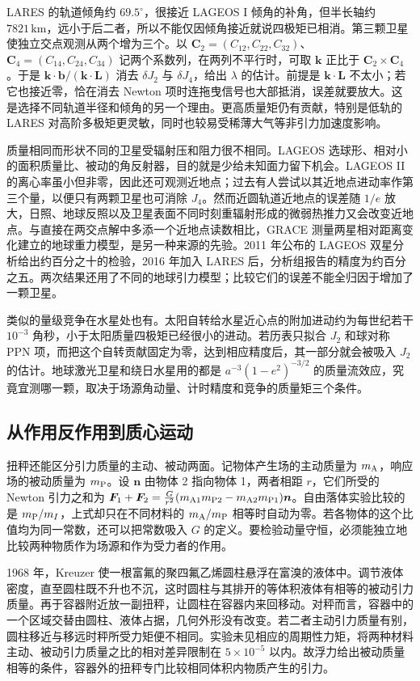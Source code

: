 LARES 的轨道倾角约 $69.5^\circ$，很接近 LAGEOS I 倾角的补角，但半长轴约 $7821\,\mathrm{km}$，远小于后二者，所以不能仅因倾角接近就说四极矩已相消。第三颗卫星使独立交点观测从两个增为三个。以 $\bm C_2=(C_{12},C_{22},C_{32})$、$\bm C_4=(C_{14},C_{24},C_{34})$ 记两个系数列，在两列不平行时，可取 $\bm k$ 正比于 $\bm C_2\times\bm C_4$。于是 $\bm k\cdot\bm b/(\bm k\cdot\bm L)$ 消去 $\delta J_2$ 与 $\delta J_4$，给出 $\lambda$ 的估计。前提是 $\bm k\cdot\bm L$ 不太小；若它也接近零，恰在消去 Newton 项时连拖曳信号也大部抵消，误差就要放大。这是选择不同轨道半径和倾角的另一个理由。更高质量矩仍有贡献，特别是低轨的 LARES 对高阶多极矩更灵敏，同时也较易受稀薄大气等非引力加速度影响。

质量相同而形状不同的卫星受辐射压和阻力很不相同。LAGEOS 选球形、相对小的面积质量比、被动的角反射器，目的就是少给未知面力留下机会。LAGEOS II 的离心率虽小但非零，因此还可观测近地点；过去有人尝试以其近地点进动率作第三个量，以便只有两颗卫星也可消除 $J_4$。然而近圆轨道近地点的误差随 $1/e$ 放大，日照、地球反照以及卫星表面不同时刻重辐射形成的微弱热推力又会改变近地点。与直接在两交点解中多添一个近地点读数相比，GRACE 测量两星相对距离变化建立的地球重力模型，是另一种来源的先验。2011 年公布的 LAGEOS 双星分析给出约百分之十的检验，2016 年加入 LARES 后，分析组报告的精度为约百分之五。两次结果还用了不同的地球引力模型；比较它们的误差不能全归因于增加了一颗卫星。

类似的量级竞争在水星处也有。太阳自转给水星近心点的附加进动约为每世纪若干 $10^{-3}$ 角秒，小于太阳质量四极矩已经很小的进动。若历表只拟合 $J_2$ 和球对称 PPN 项，而把这个自转贡献固定为零，达到相应精度后，其一部分就会被吸入 $J_2$ 的估计。地球激光卫星和绕日水星用的都是 $a^{-3}(1-e^2)^{-3/2}$ 的质量流效应，究竟宜测哪一颗，取决于场源角动量、计时精度和竞争的质量矩三个条件。

\subsection{从作用反作用到质心运动}

扭秤还能区分引力质量的主动、被动两面。记物体产生场的主动质量为 $m_{\rm A}$，响应场的被动质量为 $m_{\rm P}$。设 $\bm n$ 由物体 2 指向物体 1，两者相距 $r$，它们所受的 Newton 引力之和为 $\bm F_1+\bm F_2=\frac{G}{r^2} (m_{{\rm A}1}m_{{\rm P}2}-m_{{\rm A}2}m_{{\rm P}1})\bm n$。自由落体实验比较的是 $m_{\rm P}/m_I$，上式却只在不同材料的 $m_{\rm A}/m_{\rm P}$ 相等时自动为零。若各物体的这个比值均为同一常数，还可以把常数吸入 $G$ 的定义。要检验动量守恒，必须能独立地比较两种物质作为场源和作为受力者的作用。

1968 年，Kreuzer 使一根富氟的聚四氟乙烯圆柱悬浮在富溴的液体中。调节液体密度，直至圆柱既不升也不沉，这时圆柱与其排开的等体积液体有相等的被动引力质量。再于容器附近放一副扭秤，让圆柱在容器内来回移动。对秤而言，容器中的一个区域交替由圆柱、液体占据，几何外形没有改变。若二者主动引力质量有别，圆柱移近与移远时秤所受力矩便不相同。实验未见相应的周期性力矩，将两种材料主动、被动引力质量之比的相对差异限制在 $5\times10^{-5}$ 以内。故浮力给出被动质量相等的条件，容器外的扭秤专门比较相同体积内物质产生的引力。

